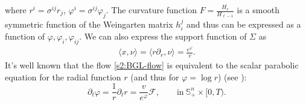 \documentclass[11pt,reqno]{amsart}
\theoremstyle{definition}
\theoremstyle{remark}
\numberwithin{equation}{section}
\renewcommand{\(}{\left(}
\renewcommand{\)}{\right)}
\renewcommand{\-}{\overline}
\newcommand{\s}{\sigma}
\begin{document}
where $r^i=\s^{ij}r_j$, $\varphi^i=\s^{ij}\varphi_j$. The curvature function $F=\frac{H_\ell}{H_{\ell-1}}$ is a smooth symmetric function of the Weingarten matrix $h_i^j$ and thus can be expressed as a function of $\varphi,\varphi_i,\varphi_{ij}$. We can also express the support function of $\Sigma$ as
\begin{align*}
\langle x,\nu\rangle=\langle r\partial_r,\nu\rangle=\frac{e^\varphi}{v}.
\end{align*}
It's well known that the flow \eqref{s2:BGL-flow} is equivalent to the scalar parabolic equation for the radial function $r$ (and thus for $\varphi=\log r$) (see \cite{Ger06}):
\begin{equation}\label{s6.dr}
  \partial_t\varphi=\frac{1}{r}\partial_tr=\frac{v}{e^\varphi}\mathcal{F},\qquad \text{in}~ \mathbb S_+^n \times [0,T).
\end{equation}
\end{document}
